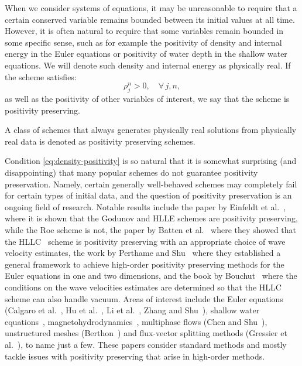 When we consider systems of equations, it may be unreasonable to require that a certain conserved variable remains bounded between its initial values at all time. However, it is often natural to require that some variables remain bounded in some specific sense, such as for example the positivity of density and internal energy in the Euler equations or positivity of water depth in the shallow water equations. We will denote such density and internal energy as physically real. If the scheme satisfies:
\begin{equation} \label{eq:density-positivity}
\rho_j^n > 0, \quad \forall \, j,n,
\end{equation}
as well as the positivity of other variables of interest, we say that the scheme is positivity preserving.
\begin{definition}
A class of schemes that always generates physically real solutions from physically real data is denoted as positivity preserving schemes.
\end{definition}
Condition \eqref{eq:density-positivity} is so natural that it is somewhat surprising (and disappointing) that many popular schemes do not guarantee positivity preservation. Namely, certain generally well-behaved schemes may completely fail for certain types of initial data, and the question of positivity preservation is an ongoing field of research. Notable results include the paper by Einfeldt et al.~\cite{ein91}, where it is shown that the Godunov and HLLE schemes are positivity preserving, while the Roe scheme is not, the paper by Batten et al.~\cite{bat97} where they showed that the HLLC~\cite{tor94} scheme is positivity preserving with an appropriate choice of wave velocity estimates, the work by Perthame and Shu~\cite{per96} where they established a general framework to achieve high-order positivity preserving methods for the Euler equations in one and two dimensions, and the book by  Bouchut~\cite{bou04} where the conditions on the wave velocities estimates are determined so that the HLLC scheme can also handle vacuum. Areas of interest include the Euler equations (Calgaro et al.~\cite{cal13}, Hu et al.~\cite{hu13}, Li et al.~\cite{li17}, Zhang and Shu~\cite{zha10b,zha11,zha12}), shallow water equations~\cite{shi16,kur07,xin10,aud05}, magnetohydrodynamics~\cite{bal99,jan00,gal03}, multiphase flows (Chen and Shu~\cite{che14}), unstructured meshes (Berthon~\cite{ber06}) and flux-vector splitting methods (Gressier et al.~\cite{gre99}), to name just a few. These papers consider standard methods and mostly tackle issues with positivity preserving that arise in high-order methods. 

